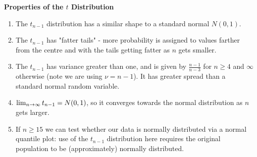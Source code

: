\documentclass[10pt, a4paper]{article}
\begin{document}
\textbf{Properties of the $t$ Distribution}
\begin{enumerate}[label = (\roman*)]
    \item The $t_{n - 1}$ distribution has a similar shape to a standard normal $N(0, 1)$.

    \item The $t_{n - 1}$ has "fatter tails" - more probability is assigned to values farther from the centre and with the tails getting fatter as $n$ gets smaller.

    \item The $t_{n - 1}$ has variance greater than one,
    and is given by $\frac{n - 1}{n - 3}$ for $n \geq 4$ and $\infty$ otherwise
    (note we are using $\nu = n - 1$).
    It has greater spread than a standard normal random variable.

    \item $\lim_{n \rightarrow \infty} t_{n - 1} = N(0, 1)$,
    so it converges towards the normal distribution as $n$ gets larger.

    \item If $n \geq 15$ we can test whether our data is normally distributed via a normal quantile plot:
    use of the $t_{n - 1}$ distribution here requires the original population to be
    (approximately)
    normally distributed.
\end{enumerate}
\end{document}
